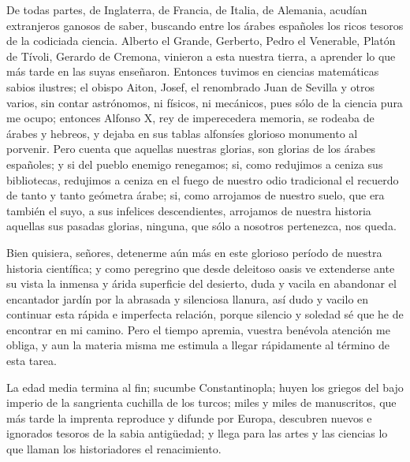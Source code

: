 \documentclass[a4paper, 12pt]{article}
\begin{document}
De todas partes, de Inglaterra, de Francia, de Italia, de Alemania, acudían extranjeros ganosos de saber, buscando entre los árabes españoles los ricos tesoros de la codiciada ciencia.  Alberto el Grande, Gerberto, Pedro el Venerable, Platón de Tívoli, Gerardo de Cremona, vinieron a esta nuestra tierra, a aprender lo que más tarde en las suyas enseñaron.  Entonces tuvimos en ciencias matemáticas sabios ilustres; el obispo Aiton, Josef, el renombrado Juan de Sevilla y otros varios, sin contar astrónomos, ni físicos, ni mecánicos, pues sólo de la ciencia pura me ocupo; entonces Alfonso X, rey de imperecedera memoria, se rodeaba de árabes y hebreos, y dejaba en sus tablas alfonsíes glorioso monumento al porvenir.  Pero cuenta que aquellas nuestras glorias, son glorias de los árabes españoles; y si del pueblo enemigo renegamos; si, como redujimos a ceniza sus bibliotecas, redujimos a ceniza en el fuego de nuestro odio tradicional el recuerdo de tanto y tanto geómetra árabe; si, como arrojamos de nuestro suelo, que era también el suyo, a sus infelices descendientes, arrojamos de nuestra historia aquellas sus pasadas glorias, ninguna, que sólo a nosotros pertenezca, nos queda.

Bien quisiera, señores, detenerme aún más en este glorioso período de nuestra historia científica; y como peregrino que desde deleitoso oasis ve extenderse ante su vista la inmensa y árida superficie del desierto, duda y vacila en abandonar el encantador jardín por la abrasada y silenciosa llanura, así dudo y vacilo en continuar esta rápida e imperfecta relación, porque silencio y soledad sé que he de encontrar en mi camino.  Pero el tiempo apremia, vuestra benévola atención me obliga, y aun la materia misma me estimula a llegar rápidamente al término de esta tarea.

La edad media termina al fin; sucumbe Constantinopla; huyen los griegos del bajo imperio de la sangrienta cuchilla de los turcos; miles y miles de manuscritos, que más tarde la imprenta reproduce y difunde por Europa, descubren nuevos e ignorados tesoros de la sabia antigüedad; y llega para las artes y las ciencias lo que llaman los historiadores el renacimiento.
\end{document}
